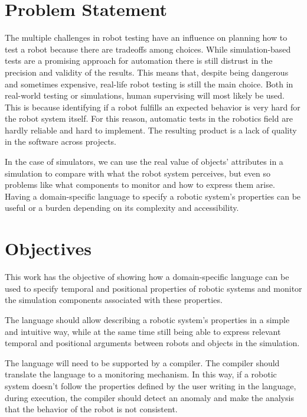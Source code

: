 \section{Problem Statement}
\label{sec:problem}

The multiple challenges in robot testing have an influence on planning how to test a robot because there are tradeoffs among choices. While simulation-based tests are a promising approach for automation there is still distrust in the precision and validity of the results. This means that, despite being dangerous and sometimes expensive, real-life robot testing is still the main choice. Both in real-world testing or simulations, human supervising will most likely be used. This is because identifying if a robot fulfills an expected behavior is very hard for the robot system itself. For this reason, automatic tests in the robotics field are hardly reliable and hard to implement. The resulting product is a lack of quality in the software across projects.

In the case of simulators, we can use the real value of objects' attributes in a simulation to compare with what the robot system perceives, but even so problems like what components to monitor and how to express them arise. Having a domain-specific language to specify a robotic system's properties can be useful or a burden depending on its complexity and accessibility.

\section{Objectives}
\label{sec:objectives}

This work has the objective of showing how a domain-specific language can be used to specify temporal and positional properties of robotic systems and monitor the simulation components associated with these properties.

The language should allow describing a robotic system's properties in a simple and intuitive way, while at the same time still being able to express relevant temporal and positional arguments between robots and objects in the simulation.

The language will need to be supported by a compiler. The compiler should translate the language to a monitoring mechanism. In this way, if a robotic system doesn't follow the properties defined by the user writing in the language, during execution, the compiler should detect an anomaly and make the analysis that the behavior of the robot is not consistent.

